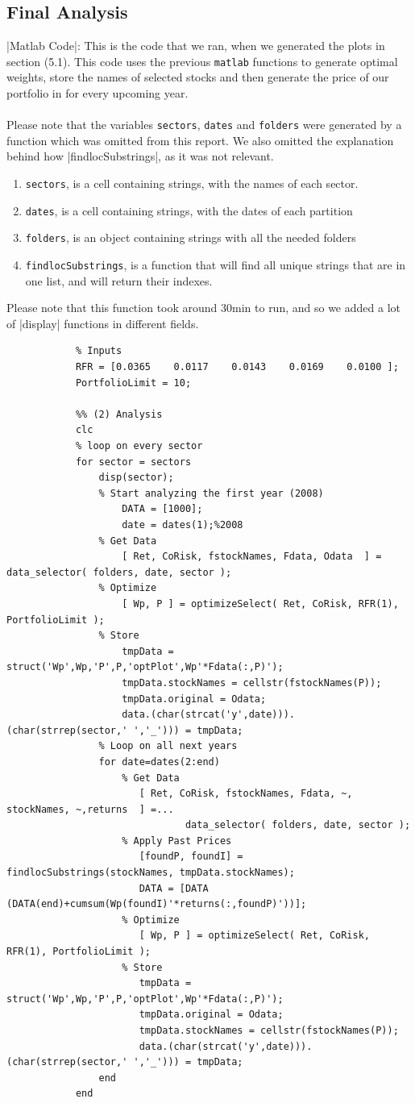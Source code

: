 \documentclass[12pt,titlepage,letter]{article}
\begin{document}
	\subsection{Final Analysis}
		|Matlab Code|: This is the code that we ran, when we generated the plots in section (5.1). This code uses the previous \verb|matlab| functions to generate optimal weights, store the names of selected stocks and then generate the price of our portfolio in for every upcoming year.\\
		\\
		Please note that the variables \verb|sectors|, \verb|dates| and \verb|folders| were generated by a function which was omitted from this report. We also omitted the explanation behind how |findlocSubstrings|, as it was not relevant.\\
		\begin{enumerate}
			\item \verb|sectors|, is a cell containing strings, with the names of each sector.
			\item \verb|dates|, is a cell containing strings, with the dates of each partition
			\item \verb|folders|, is an object containing strings with all the needed folders
			\item \verb|findlocSubstrings|, is a function that will find all unique strings that are in one list, and will return their indexes. 
		\end{enumerate}
		Please note that this function took around 30min to run, and so we added a lot of |display| functions in different fields.
		\begin{lstlisting}
			% Inputs
			RFR = [0.0365    0.0117    0.0143    0.0169    0.0100 ];
			PortfolioLimit = 10;

			%% (2) Analysis
			clc
			% loop on every sector
			for sector = sectors
			    disp(sector);
			    % Start analyzing the first year (2008)
				    DATA = [1000];
				    date = dates(1);%2008
			    % Get Data
				    [ Ret, CoRisk, fstockNames, Fdata, Odata  ] = data_selector( folders, date, sector );
			    % Optimize
				    [ Wp, P ] = optimizeSelect( Ret, CoRisk, RFR(1), PortfolioLimit );
			    % Store
				    tmpData = struct('Wp',Wp,'P',P,'optPlot',Wp'*Fdata(:,P)');
				    tmpData.stockNames = cellstr(fstockNames(P));
				    tmpData.original = Odata;
				    data.(char(strcat('y',date))).(char(strrep(sector,' ','_'))) = tmpData;
			    % Loop on all next years
			    for date=dates(2:end)
			        % Get Data
			           [ Ret, CoRisk, fstockNames, Fdata, ~, stockNames, ~,returns  ] =...
			           	       data_selector( folders, date, sector );
			        % Apply Past Prices
			           [foundP, foundI] = findlocSubstrings(stockNames, tmpData.stockNames);
			           DATA = [DATA (DATA(end)+cumsum(Wp(foundI)'*returns(:,foundP)'))];
			        % Optimize
			           [ Wp, P ] = optimizeSelect( Ret, CoRisk, RFR(1), PortfolioLimit );
			        % Store
			           tmpData = struct('Wp',Wp,'P',P,'optPlot',Wp'*Fdata(:,P)');
				       tmpData.original = Odata;
				       tmpData.stockNames = cellstr(fstockNames(P));
				       data.(char(strcat('y',date))).(char(strrep(sector,' ','_'))) = tmpData;
			    end
			end
		\end{lstlisting}
\end{document}
